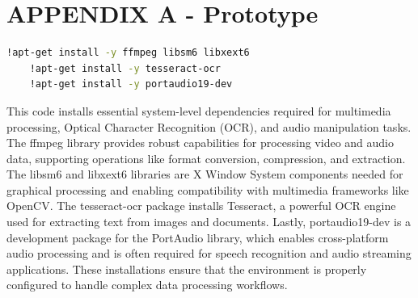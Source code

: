 

\section*{APPENDIX A - Prototype \label{sec:proto}}

\begin{tcolorbox}[colback=gray!5!white, colframe=gray!80!black, boxrule=0.5pt, title=System Dependencies Installation]
    \begin{lstlisting}[language=Bash]
    !apt-get install -y ffmpeg libsm6 libxext6
    !apt-get install -y tesseract-ocr
    !apt-get install -y portaudio19-dev
    \end{lstlisting}
\end{tcolorbox}

\noindent
This code installs essential system-level dependencies required for multimedia processing, Optical Character Recognition (OCR), and audio manipulation tasks. The ffmpeg library provides robust capabilities for processing video and audio data, supporting operations like format conversion, compression, and extraction. The libsm6 and libxext6 libraries are X Window System components needed for graphical processing and enabling compatibility with multimedia frameworks like OpenCV. The tesseract-ocr package installs Tesseract, a powerful OCR engine used for extracting text from images and documents. Lastly, portaudio19-dev is a development package for the PortAudio library, which enables cross-platform audio processing and is often required for speech recognition and audio streaming applications. These installations ensure that the environment is properly configured to handle complex data processing workflows.


